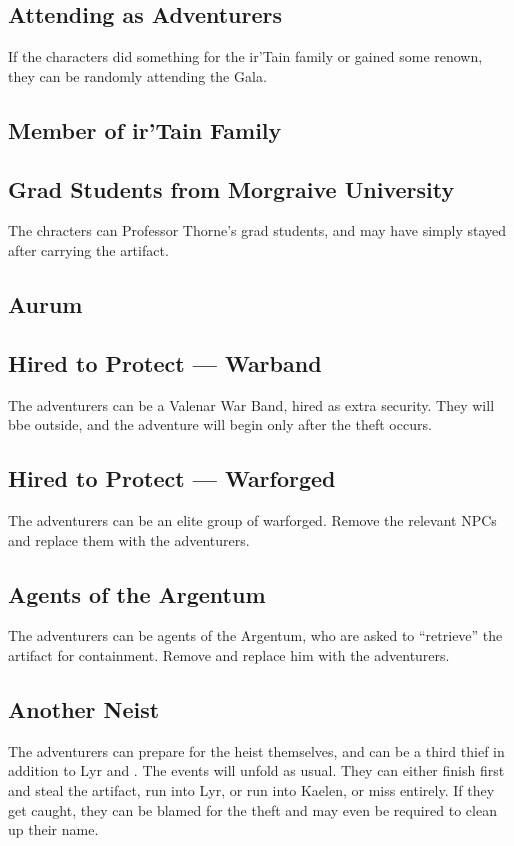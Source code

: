 \documentclass[twocolumn]{dndbook}
\begin{document}
\subsection{Attending as Adventurers}
If the characters did something for the ir'Tain family or gained some renown, they can be randomly attending the Gala.

\subsection{Member of ir'Tain Family}

\subsection{Grad Students from Morgraive University}
The chracters can Professor Thorne's grad students, and may have simply stayed after carrying the artifact.

\subsection{Aurum}

\subsection{Hired to Protect --- Warband}
The adventurers can be a Valenar War Band, hired as extra security. They will bbe outside, and the adventure will begin only after the theft occurs.

\subsection{Hired to Protect --- Warforged}
The adventurers can be an elite group of warforged. Remove the relevant NPCs and replace them with the adventurers.

\subsection{Agents of the Argentum}
The adventurers can be agents of the Argentum, who are asked to ``retrieve'' the artifact for containment. Remove  and replace him with the adventurers.

\subsection{Another Neist}
The adventurers can prepare for the heist themselves, and can be a third thief in addition to Lyr and . The events will unfold as usual.
They can either finish first and steal the artifact, run into Lyr, or run into Kaelen, or miss entirely.
If they get caught, they can be blamed for the theft and may even be required to clean up their name.
\end{document}
